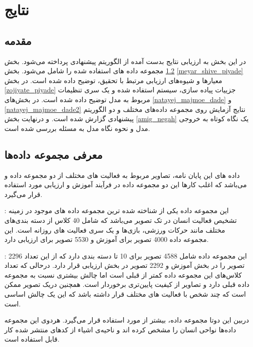 \chapter{نتایج}
\label{chap:results}
\section{مقدمه} \label{introduction}
در این بخش به ارزیابی نتایج بدست آمده از الگوریتم پیشنهادی پرداخته می‌شود. بخش %
\ref{datasets}
مجموعه داده‌ های استفاده شده را شامل می‌شود. بخش %
\ref{meyar_shive_piyade}
معیار‌ها و شیوه‌های ارزیابی مرتبط با تحقیق، توضیح داده شده است. در بخش %
\ref{zojiyate_piyade}
جزییات پیاده سازی، سیستم استفاده شده و یک سری تنظیمات مربوط به مدل توضیح داده شده است.
 در بخش‌های %
\ref{natayej_majmoe_dade}
و
\ref{natayej_majmoe_dade2}
نتایج آزمایش روی مجموعه داده‌های مختلف و دو الگوریتم پیشنهادی گزارش شده است. و درنهایت بخش %
\ref{amig_negah}
یک نگاه کوتاه به خروجی مدل و نحوه نگاه مدل به مسئله بررسی شده است.

\section{‌معرفی مجموعه داده‌ها} \label{datasets}
داده های این پایان نامه، تصاویر مربوط به فعالیت های مختلف از دو مجموعه داده %
 و %
 می‌باشد که اغلب کارها این دو مجموعه داده در فرآیند آموزش و ارزیابی مورد استفاده قرار می‌گیرد.
 
: این مجموعه داده یکی از شناخته شده ترین مجموعه داده های موجود در زمینه تشخیص فعالیت انسان در تک تصویر می‌باشد که شامل 40 کلاس از دسته بندی‌های مختلف مانند حرکات ورزشی، بازی‌ها و یک سری فعالیت های روزانه است. این مجموعه داده 4000 تصویر برای آموزش و 5530 تصویر برای ارزیابی دارد.
 
 : این مجموعه داده شامل 4588 تصویر برای 10 تا دسته بندی دارد که از این تعداد 2296 تصویر را در بخش آموزش و 2292 تصویر در بخش ارزیابی قرار دارد. درحالی که تعداد کلاس‌های این مجموعه داده کمتر از قبلی است اما چالش بیشتری نسبت به مجموعه داده قبلی دارد و تصاویر از کیفیت پایین‌تری برخوردار است. همچنین دریک تصویر ممکن است که چند شخص با فعالیت های مختلف قرار داشته باشد که این یک چالش اساسی است.
 
 دربین این دوتا مجموعه داده، %
 بیشتر از %
 مورد استفاده قرار می‌گیرد. هردوی این مجموعه داده‌ها نواحی انسان را مشخص کرده اند و ناحیه‌ی اشیاء از کدهای منتشر شده کار%
 \cite{Human_object_relation_action}
 قابل استفاده است.
 
